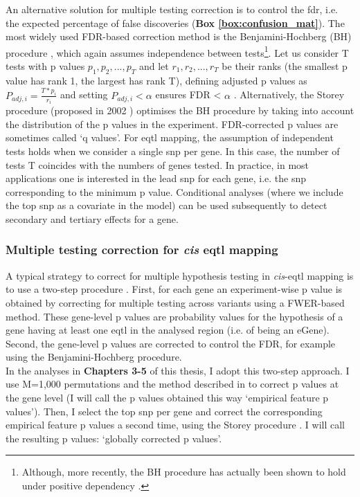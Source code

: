 An alternative solution for multiple testing correction is to control the \gls{fdr}, i.e. the expected percentage of false discoveries (\textbf{Box \ref{box:confusion_mat}}).
The most widely used FDR-based correction method is the Benjamini-Hochberg (BH) procedure \cite{benjamini1995controlling}, which again assumes independence between tests\footnote{Although, more recently, the BH procedure has actually been shown to hold under positive dependency \cite{benjamini2001control}.}. 
Let us consider T tests with p values $p_1, p_2, ..., p_T$ and let $r_1, r_2, ..., r_T$ be their ranks (the smallest p value has rank 1, the largest has rank T), defining adjusted p values as $P_{adj,i} = \frac{T*p_i}{r_i} $ and setting $P_{adj,i} <\alpha$ ensures FDR < $\alpha$ \cite{yekutieli1999resampling}.
Alternatively, the Storey procedure (proposed in 2002 \cite{storey2002direct, storey2003statistical}) optimises the BH procedure by taking into account the distribution of the p values in the experiment.
FDR-corrected p values are sometimes called `q values'.
For \gls{eqtl} mapping, the assumption of independent tests holds when we consider a single \gls{snp} per gene.
In this case, the number of tests T coincides with the numbers of genes tested.
In practice, in most applications one is interested in the lead \gls{snp} for each gene, i.e. the \gls{snp} corresponding to the minimum p value.
Conditional analyses (where we include the top \gls{snp} as a covariate in the model) can be used subsequently to detect secondary and tertiary effects for a gene.

\subsubsection{Multiple testing correction for \textit{cis} e\gls{qtl} mapping}

A typical strategy to correct for multiple hypothesis testing in \textit{cis}-e\gls{qtl} mapping is to use a two-step procedure \cite{gtex2015genotype}. 
First, for each gene an experiment-wise p value is obtained by correcting for multiple testing across variants using a FWER-based method. 
These gene-level p values are probability values for the hypothesis of a gene having at least one e\gls{qtl} in the analysed region (i.e. of being an eGene). 
Second, the gene-level p values are corrected to control the FDR, for example using the Benjamini-Hochberg procedure.\\

In the analyses in \textbf{Chapters 3-5} of this thesis, I adopt this two-step approach.
I use M=1,000 permutations and the method described in \cite{ongen2016fast} to correct p values at the gene level (I will call the p values obtained this way `empirical feature p values').
Then, I select the top \gls{snp} per gene and correct the corresponding empirical feature p values a second time, using the Storey procedure \cite{storey2002direct}.
I will call the resulting p values: `globally corrected p values'.

